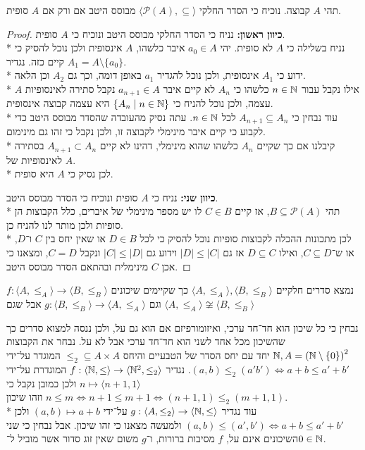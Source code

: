 \Question{}
תהי $A$ קבוצה. נוכיח כי הסדר החלקי $\langle \mathcal{P}(A), \subseteq \rangle$ מבוסס היטב אם ורק אם $A$ סופית.
\begin{proof}
	\textbf{כיוון ראשון:}
	נניח כי הסדר החלקי מבוסס היטב ונוכיח כי $A$ סופית. \\*
	נניח בשלילה כי $A$ לא סופית.
	יהי $a_0 \in A$ איבר כלשהו, $A$ אינסופית ולכן נוכל להסיק כי קיים כזה. נגדיר $A_1 = A \setminus \{ a_0 \}$. \\*
	ידוע כי $A_1$ אינסופית, ולכן נוכל להגדיר $a_1$ באופן דומה, וכך גם $A_2$ וכן הלאה. \\*
	אילו נקבל עבור $n \in \mathbb{N}$ כלשהו כי $A_n$ לא קיים איבר $a_{n + 1} \in A$ נקבל סתירה לאינסופיות $A$ עצמה, ולכן נוכל להניח כי $\{ A_n \mid n \in \mathbb{N} \}$ היא עצמה קבוצה אינסופית. \\*
	עוד נבחין כי $A_{n + 1} \subseteq A_n$ לכל $n \in \mathbb{N}$. עתה נסיק מהעובדה שהסדר מבוסס היטב כדי לקבוע כי קיים איבר מינימלי לקבוצה זו, ולכן נקבל כי זהו גם מינימום. \\*
	קיבלנו אם כך שקיים $A_n$ כלשהו שהוא מינימלי, דהינו לא קיים $A_{n + 1} \subset A_n$ בסתירה לאינסופיות של $A$. \\*
	לכן נסיק כי $A$ היא סופית.

	\textbf{כיוון שני:}
	נניח כי $A$ סופית ונוכיח כי הסדר מבוסס היטב. \\*
	תהי $B \subseteq \mathcal{P}(A)$, אז קיים $C \in B$ לו יש מספר מינימלי של איברים, כלל הקבוצות הן סופיות ולכן מותר לנו להניח כן. \\*
	לכן מתכונות ההכלה לקבוצות סופיות נוכל להסיק כי לכל $D \in B$ או שאין יחס בין $C$ ו־$D$, או ש־$C \subseteq D$, ואילו $D \subseteq C$ אז גם $|D| \le |C|$ וידוע גם $|C| \le |D|$ ונקבל $C = D$,
	ומצאנו כי אכן $C$ מינימלית ובהתאם הסדר מבוסס היטב.
\end{proof}

\Question{}
נמצא סדרים חלקיים $\langle A, \le_A \rangle, \langle B, \le_B \rangle$ כך שקיימים שיכונים $f : \langle A, \le_A \rangle \to \langle B, \le_B \rangle$
וגם $g : \langle B, \le_B \rangle \to \langle A, \le_A \rangle$ אבל שגם $\langle A, \le_A \rangle \not\cong \langle B, \le_B \rangle$

נבחין כי כל שיכון הוא חד־חד ערכי, ואיזומורפיזם אם הוא גם על, ולכן ננסה למצוא סדרים כך שהשיכון מכל אחד לשני הוא חד־חד ערכי אבל לא על.
נבחר את הקבוצות $\mathbb{N}, A = {(\mathbb{N} \setminus \{0\})}^2$ יחד עם יחס הסדר של הטבעיים והיחס $\le_2 \subseteq A \times A$ המוגדר על־ידי $(a, b) \le_2 (a' b') \iff a + b \le a' + b'$.
נגדיר $f : \langle \mathbb{N}, \le \rangle \to \langle \mathbb{N}^2, \le_2 \rangle$ המוגדרת על־ידי $n \mapsto \langle n + 1, 1 \rangle$ ולכן כמובן נקבל כי $n \le m \iff n + 1 \le m + 1 \iff (n + 1, 1) \le_2 (m + 1, 1)$ וזהו שיכון. \\*
עוד נגדיר $g : \langle A, \le_2 \rangle \to \langle \mathbb{N}, \le \rangle$ על־ידי $(a, b) \mapsto a + b$ ולכן $(a, b) \le (a', b') \iff a + b \le a' + b'$ ולמעשה מצאנו כי זהו שיכון.
אבל נבחין כי שני השיכונים אינם על, $f$ מסיבות ברורות, ו־$g$ משום שאין זוג סדור אשר מוביל ל־$0 \in \mathbb{N}$.

